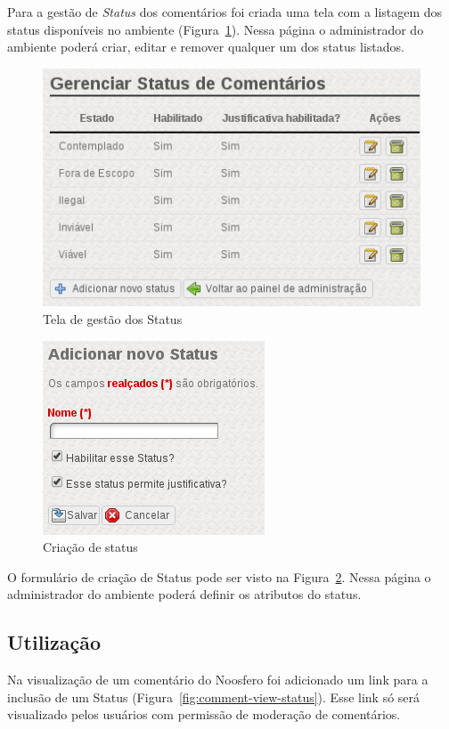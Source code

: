 \documentclass[11pt]{article}
\begin{document}
Para a gestão de {\it Status} dos comentários foi criada uma tela com
a listagem dos status disponíveis no ambiente
(Figura~\ref{fig:plugin-status-admin}). Nessa página o administrador
do ambiente poderá criar, editar e remover qualquer um dos status
listados.

\begin{figure}[h]
\center
\includegraphics[scale=0.5]{plugin-status-admin.png}
\caption{Tela de gestão dos Status}
\label{fig:plugin-status-admin}
\end{figure}

\begin{figure}[h]
\center
\includegraphics[scale=0.5]{new-status-page.png}
\caption{Criação de status}
\label{fig:new-status-page}
\end{figure}

O formulário de criação de Status pode ser visto na
Figura~\ref{fig:new-status-page}. Nessa página o administrador
do ambiente poderá definir os atributos do status.

\subsection{Utilização}

Na visualização de um comentário do Noosfero foi adicionado um link para
a inclusão de um Status (Figura~\ref{fig:comment-view-status}). Esse
link só será visualizado pelos usuários com permissão de moderação de
comentários.
\end{document}
